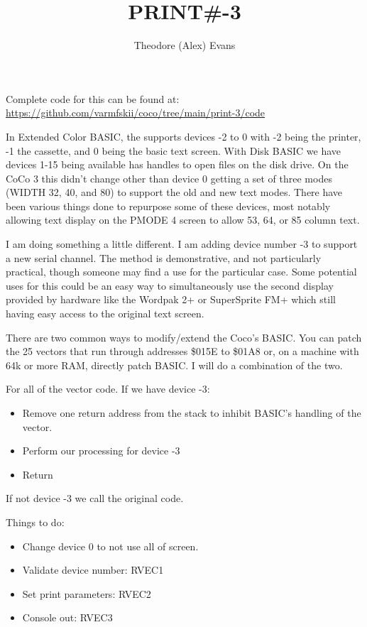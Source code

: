 \documentclass{article}
\title{PRINT\#-3}
\author{Theodore (Alex) Evans}
\begin{document}
\maketitle

Complete code for this can be found at: \url{https://github.com/varmfskii/coco/tree/main/print-3/code}

In Extended Color BASIC, the supports devices -2 to 0 with -2 being
the printer, -1 the cassette, and 0 being the basic text screen. With
Disk BASIC we have devices 1-15 being available has handles to open
files on the disk drive. On the CoCo 3 this didn't change other than
device 0 getting a set of three modes (WIDTH 32, 40, and 80) to
support the old and new text modes. There have been various things
done to repurpose some of these devices, most notably allowing text
display on the PMODE 4 screen to allow 53, 64, or 85 column text.

I am doing something a little different. I am adding device number -3
to support a new serial channel. The method is demonstrative, and not
particularly practical, though someone may find a use for the
particular case. Some potential uses for this could be an easy way to
simultaneously use the second display provided by hardware like the
Wordpak 2+ or SuperSprite FM+ which still having easy access to the
original text screen.

There are two common ways to modify/extend the Coco's BASIC. You can
patch the 25 vectors that run through addresses \$015E to \$01A8 or,
on a machine with 64k or more RAM, directly patch BASIC. I will do a
combination of the two.

For all of the vector code.
If we have device -3:
\begin{itemize}
\item Remove one return address from the stack to inhibit BASIC's
  handling of the vector.
\item Perform our processing for device -3
\item Return
\end{itemize}
If not device -3 we call the original code.

Things to do:
\begin{itemize}
\item Change device 0 to not use all of screen.
\item Validate device number:  RVEC1
\item Set print parameters: RVEC2
\item Console out: RVEC3
\end{itemize}
\end{document}
